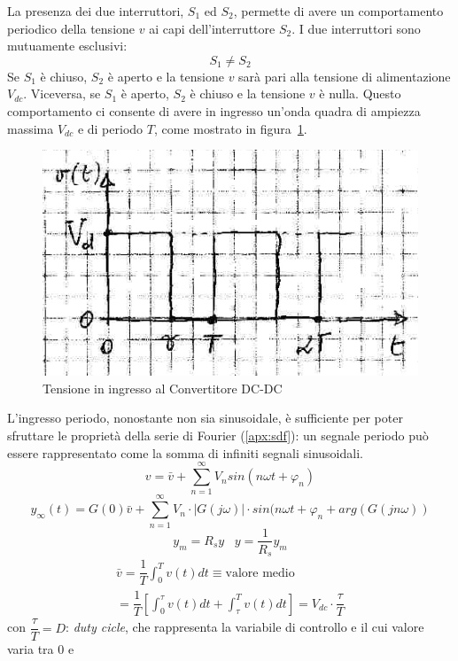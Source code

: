 \documentclass[a4paper]{report}
\begin{document}
La presenza dei due interruttori, $S_1$ ed $S_2$, permette di avere un
comportamento periodico della tensione $v$ ai capi dell'interruttore
$S_2$. I due interruttori sono mutuamente esclusivi:
\[
S_1 \neq S_2
\]
Se $S_1$ \`e chiuso, $S_2$ \`e aperto e la tensione $v$ sar\`a pari
alla tensione di alimentazione $V_{dc}$. Viceversa, se $S_1$ \`e aperto, $S_2$
\`e chiuso e la tensione $v$ \`e nulla. Questo comportamento ci
consente di avere in ingresso un'onda quadra di ampiezza massima
$V_{dc}$ e di periodo $T$, come mostrato in
figura~\ref{fig:convertitore-dcdc02}. 
\begin{figure}[!h]
  \begin{center}
    \includegraphics[scale=0.4]{./images/convertitore-dcdc02}
    \caption{Tensione in ingresso al Convertitore
      DC-DC}\label{fig:convertitore-dcdc02} 
  \end{center}
\end{figure}
L'ingresso periodo, nonostante non sia sinusoidale, \`e sufficiente
per poter sfruttare le propriet\`a della serie di
Fourier (\ref{apx:sdf}): un segnale periodo pu\`o essere rappresentato
come la somma di infiniti segnali sinusoidali.
\[
v = \bar{v} + \sum_{n=1}^{\infty} V_n sin(n \omega t + \varphi_n)
\]
\[
y_{\infty}(t) = G(0) \bar{v} + \sum_{n=1}^{\infty} V_n \cdot
|G(j\omega)| \cdot sin(n \omega t + \varphi_{n} + arg(G(j n \omega))
\]
\[
y_m = R_s y \;\;\; y = \dfrac{1}{R_s} y_m
\]
\[
\begin{array}{l}
  \bar{v} = \dfrac{1}{T} \int_0^T v(t) dt \equiv \textrm{valore
    medio}\\
  = \dfrac{1}{T} \left[ \int_0^{\tau} v(t) dt + \int_{\tau}^T v(t) dt
    \right] = V_{dc} \cdot \dfrac{\tau}{T}
\end{array}
\]
con $\dfrac{\tau}{T} = D$: {\em duty cicle}, che
rappresenta la variabile di controllo e il cui valore varia tra $0$ e
\end{document}
